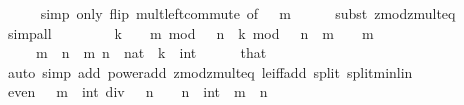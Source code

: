 \begin{isabellebody}
\ \ \ \ \isamarkupfalse%
\ {\isacharparenleft}{\kern0pt}simp\ only{\isacharcolon}{\kern0pt}\ flip{\isacharcolon}{\kern0pt}\ mult{\isachardot}{\kern0pt}left{\isacharunderscore}{\kern0pt}commute\ {\isacharbrackleft}{\kern0pt}of\ {\isacartoucheopen}{}\ {\isacharcircum}{\kern0pt}\ m{\isacartoucheclose}{\isacharbrackright}{\kern0pt}{\isacharparenright}{\kern0pt}\isanewline
\ \ \ \ \isamarkupfalse%
\ {\isacharparenleft}{\kern0pt}subst\ zmod{\isacharunderscore}{\kern0pt}zmult{}{\isacharunderscore}{\kern0pt}eq{\isacharparenright}{\kern0pt}\ \isamarkupfalse%
\ simp{\isacharunderscore}{\kern0pt}all\isanewline
\ \ \ \ \isamarkupfalse%
\isanewline
\ \ \isamarkupfalse%
\ {\isacartoucheopen}{\isacharparenleft}{\kern0pt}k\ {\isacharasterisk}{\kern0pt}\ {}\ {\isacharcircum}{\kern0pt}\ m{\isacharparenright}{\kern0pt}\ mod\ {\isacharparenleft}{\kern0pt}{}\ {\isacharcircum}{\kern0pt}\ n{\isacharparenright}{\kern0pt}\ {\isacharequal}{\kern0pt}\ {\isacharparenleft}{\kern0pt}k\ mod\ {}\ {\isacharcircum}{\kern0pt}\ {\isacharparenleft}{\kern0pt}n\ {\isacharminus}{\kern0pt}\ m{\isacharparenright}{\kern0pt}{\isacharparenright}{\kern0pt}\ {\isacharasterisk}{\kern0pt}\ {}\ {\isacharcircum}{\kern0pt}\ m{\isacartoucheclose}\isanewline
\ \ \ \ \ {\isacartoucheopen}m\ {\isasymle}\ n{\isacartoucheclose}\ \ m\ n\ {\isacharcolon}{\kern0pt}{\isacharcolon}{\kern0pt}\ nat\ \ k\ {\isacharcolon}{\kern0pt}{\isacharcolon}{\kern0pt}\ int\isanewline
\ \ \ \ \isamarkupfalse%
\ that\isanewline
\ \ \ \ \isamarkupfalse%
\ {\isacharparenleft}{\kern0pt}auto\ simp\ add{\isacharcolon}{\kern0pt}\ power{\isacharunderscore}{\kern0pt}add\ zmod{\isacharunderscore}{\kern0pt}zmult{}{\isacharunderscore}{\kern0pt}eq\ le{\isacharunderscore}{\kern0pt}iff{\isacharunderscore}{\kern0pt}add\ split{\isacharcolon}{\kern0pt}\ split{\isacharunderscore}{\kern0pt}min{\isacharunderscore}{\kern0pt}lin{\isacharparenright}{\kern0pt}\isanewline
\ \ \ \ \isamarkupfalse%
\isanewline
\ \ \isamarkupfalse%
\ {\isacartoucheopen}even\ {\isacharparenleft}{\kern0pt}{\isacharparenleft}{\kern0pt}{}\ {\isacharcircum}{\kern0pt}\ m\ {\isacharminus}{\kern0pt}\ {\isacharparenleft}{\kern0pt}{}{\isacharcolon}{\kern0pt}{\isacharcolon}{\kern0pt}int{\isacharparenright}{\kern0pt}{\isacharparenright}{\kern0pt}\ div\ {}\ {\isacharcircum}{\kern0pt}\ n{\isacharparenright}{\kern0pt}\ {\isasymlongleftrightarrow}\ {}\ {\isacharcircum}{\kern0pt}\ n\ {\isacharequal}{\kern0pt}\ {\isacharparenleft}{\kern0pt}{}{\isacharcolon}{\kern0pt}{\isacharcolon}{\kern0pt}int{\isacharparenright}{\kern0pt}\ {\isasymor}\ m\ {\isasymle}\ n{\isacartoucheclose}\isanewline

\end{isabellebody}
